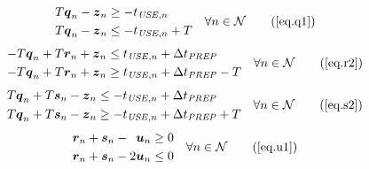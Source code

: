 \begin{equation}
    \begin{split}
        \begin{alignedat}{2}
            T \boldsymbol{q}_{n} - \boldsymbol{z}_{n} &\ge
            - t_{\mathit{USE},n}\\
            T \boldsymbol{q}_{n} - \boldsymbol{z}_{n} &\le
            - t_{\mathit{USE},n} + T\\
        \end{alignedat}
    \end{split}
    \quad \forall n \in \mathcal{N}
    \tag{\ref{eq.q1}}
\end{equation}
\begin{equation}
    \begin{split}
        \begin{alignedat}{2}
            -T \boldsymbol{q}_{n} + T \boldsymbol{r}_{n} + \boldsymbol{z}_{n}
            &\le t_{\mathit{USE},n} + \Delta t_{\mathit{PREP}}\\
            -T \boldsymbol{q}_{n} + T \boldsymbol{r}_{n} + \boldsymbol{z}_{n}
            &\ge t_{\mathit{USE},n} + \Delta t_{\mathit{PREP}} - T\\
            \end{alignedat}
        \quad \forall n \in \mathcal{N}
    \end{split}
    \tag{\ref{eq.r2}}
\end{equation}
\begin{equation}
    \begin{split}
        \begin{alignedat}{2}
            T \boldsymbol{q}_{n} + T \boldsymbol{s}_{n} - \boldsymbol{z}_{n}
            &\le -t_{\mathit{USE},n} + \Delta t_{\mathit{PREP}}\\
            T \boldsymbol{q}_{n} + T \boldsymbol{s}_{n} - \boldsymbol{z}_{n}
            &\ge -t_{\mathit{USE},n} + \Delta t_{\mathit{PREP}} + T\\
            \end{alignedat}
        \quad \forall n \in \mathcal{N}
    \end{split}
    \tag{\ref{eq.s2}}
\end{equation}
\begin{equation}
    \begin{split}
        \begin{alignedat}{8}
            &&\boldsymbol{r}_{n} && {}+{} &&\boldsymbol{s}_{n} && {}-{} 
            &&\boldsymbol{u}_{n} &\ge 0\\
            &&\boldsymbol{r}_{n} && {}+{} &&\boldsymbol{s}_{n} && {}-{} 
            &2&\boldsymbol{u}_{n} &\le 0\\
        \end{alignedat}
        \quad \forall n \in \mathcal{N}
    \end{split}
    \tag{\ref{eq.u1}}
\end{equation}
